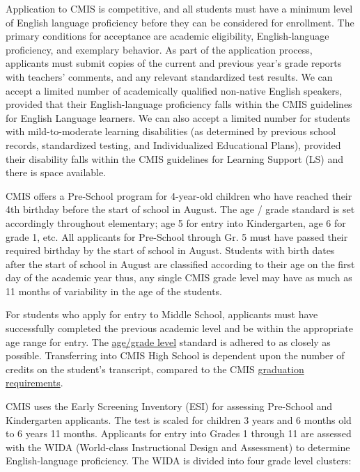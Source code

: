 
Application to CMIS is competitive, and all students must have a minimum level of English language proficiency before they can be considered for enrollment.  The primary conditions for acceptance are academic eligibility, English-language proficiency, and exemplary behavior.  As part of the application process, applicants must submit copies of the current and previous year’s grade reports with teachers' comments, and any relevant standardized test results.  We can accept a limited number of academically qualified non-native English speakers, provided that their English-language proficiency falls within the CMIS guidelines for English Language learners. We can also accept a limited number for students with mild-to-moderate learning disabilities (as determined by previous school records, standardized testing, and Individualized Educational Plans), provided their disability falls within the CMIS guidelines for Learning Support (LS) and there is space available.


CMIS offers a Pre-School program for 4-year-old children who have reached their 4th birthday before the start of school in August.  The age / grade standard is set accordingly throughout elementary; age 5 for entry into Kindergarten, age 6 for grade 1, etc.  All applicants for Pre-School through Gr. 5 must have passed their required birthday by the start of school in August.  Students with birth dates after the start of school in August are classified according to their age on the first day of the academic year thus, any single CMIS grade level may have as much as 11 months of variability in the age of the students.  

For students who apply for entry to Middle School, applicants must have successfully completed the previous academic level and be within the appropriate age range for entry.  The \href{http://cmis.ac.th/admissions}{age/grade level} standard is adhered to as closely as possible.  Transferring into CMIS High School is dependent upon the number of credits on the student's transcript, compared to the CMIS \href{http://cmis.ac.th/programs/high_school}{graduation requirements}.


CMIS uses the Early Screening Inventory (ESI) for assessing Pre-School and Kindergarten applicants.  The test is scaled for children 3 years and 6 months old to 6 years 11 months.  Applicants for entry into Grades 1 through 11 are assessed with the WIDA (World-class Instructional Design and Assessment) to determine English-language proficiency.  The WIDA is divided into four grade level clusters:

